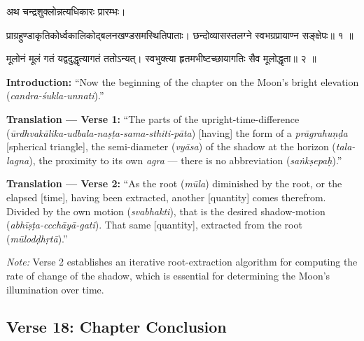 \documentclass[11pt,a4paper]{article}
\newcommand{\dev}[1]{{\devanagarifont #1}}
\newenvironment{sanskritverse}{%
  \begin{center}\begin{minipage}{0.95\textwidth}
  \setlength{\leftskip}{1em}
  \setlength{\rightskip}{1em}
  \dev
}{\end{minipage}\end{center}}
\newenvironment{paracol}[1]{\begingroup}{\endgroup}
\newcommand{\switchcolumn}[1][]{%
  \ifnum#1=0\relax\else\par\nobreak\vspace{0.5em}\par\nobreak\fi%
}
\begin{document}
\begin{paracol}{2}

\begin{sanskritverse}
अथ चन्द्रशुक्लोन्नत्यधिकारः प्रारम्भः।
\end{sanskritverse}

\begin{sanskritverse}
प्राग्रहुण्डाकृतिकोर्ध्वकालिकोद्बलनखण्डसमस्थितिपाताः।
छन्दोव्यासस्तलग्ने स्वभग्रप्रायाण्न सङ्क्षेपः॥ १ ॥
\end{sanskritverse}

\begin{sanskritverse}
मूलोनं मूलं गतं यद्वदुद्धृत्यागतं ततोऽन्यत्।
स्वभुक्त्या हृतमभीष्टच्छायागतिः सैव मूलोद्धृता॥ २ ॥
\end{sanskritverse}

\switchcolumn

\textbf{Introduction:} ``Now the beginning of the chapter on the Moon's bright elevation (\textit{candra-śukla-unnati}).''

\textbf{Translation — Verse 1:} ``The parts of the upright-time-difference (\textit{ūrdhvakālika-udbala-naṣṭa-sama-sthiti-pāta}) [having] the form of a \textit{prāgrahuṇḍa} [spherical triangle], the semi-diameter (\textit{vyāsa}) of the shadow at the horizon (\textit{tala-lagna}), the proximity to its own \textit{agra} --- there is no abbreviation (\textit{saṅkṣepaḥ}).''

\textbf{Translation — Verse 2:} ``As the root (\textit{mūla}) diminished by the root, or the elapsed [time], having been extracted, another [quantity] comes therefrom. Divided by the own motion (\textit{svabhakti}), that is the desired shadow-motion (\textit{abhīṣṭa-ccchāyā-gati}). That same [quantity], extracted from the root (\textit{mūlodḍhṛtā}).''

\textit{Note:} Verse 2 establishes an iterative root-extraction algorithm for computing the rate of change of the shadow, which is essential for determining the Moon's illumination over time.

\end{paracol}

\subsection{Verse 18: Chapter Conclusion}
\end{document}
